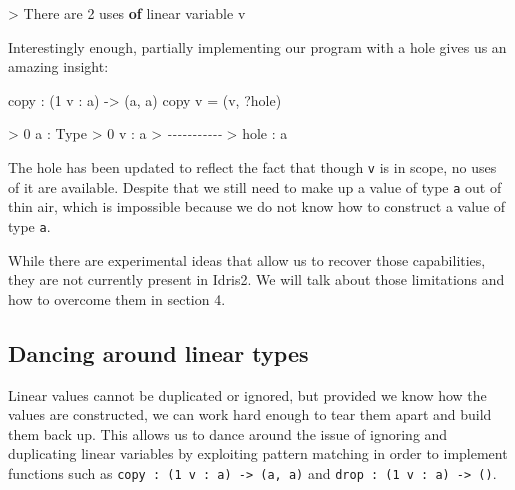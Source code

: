 \documentclass[
]{article}
\newenvironment{Shaded}{}{}
\newcommand{\CommentTok}[1]{\textcolor[rgb]{0.38,0.63,0.69}{\textit{#1}}}
\newcommand{\DataTypeTok}[1]{\textcolor[rgb]{0.56,0.13,0.00}{#1}}
\newcommand{\DecValTok}[1]{\textcolor[rgb]{0.25,0.63,0.44}{#1}}
\newcommand{\KeywordTok}[1]{\textcolor[rgb]{0.00,0.44,0.13}{\textbf{#1}}}
\newcommand{\NormalTok}[1]{#1}
\newcommand{\OperatorTok}[1]{\textcolor[rgb]{0.40,0.40,0.40}{#1}}
\newcommand{\OtherTok}[1]{\textcolor[rgb]{0.00,0.44,0.13}{#1}}
\begin{document}
\begin{Shaded}
\begin{Highlighting}[]
\OperatorTok{\textgreater{}} \DataTypeTok{There}\NormalTok{ are }\DecValTok{2}\NormalTok{ uses }\KeywordTok{of}\NormalTok{ linear variable v}
\end{Highlighting}
\end{Shaded}

Interestingly enough, partially implementing our program with a hole
gives us an amazing insight:

\begin{Shaded}
\begin{Highlighting}[]
\NormalTok{copy }\OperatorTok{:}\NormalTok{ (}\DecValTok{1}\NormalTok{ v }\OperatorTok{:}\NormalTok{ a) }\OtherTok{{-}\textgreater{}}\NormalTok{ (a, a)}
\NormalTok{copy v }\OtherTok{=}\NormalTok{ (v, }\OperatorTok{?}\NormalTok{hole)}
\end{Highlighting}
\end{Shaded}

\begin{Shaded}
\begin{Highlighting}[]
\OperatorTok{\textgreater{}} \DecValTok{0}\NormalTok{ a }\OperatorTok{:} \DataTypeTok{Type}
\OperatorTok{\textgreater{}} \DecValTok{0}\NormalTok{ v }\OperatorTok{:}\NormalTok{ a}
\OperatorTok{\textgreater{}} \CommentTok{{-}{-}{-}{-}{-}{-}{-}{-}{-}{-}{-}}
\OperatorTok{\textgreater{}}\NormalTok{ hole }\OperatorTok{:}\NormalTok{ a}
\end{Highlighting}
\end{Shaded}

The hole has been updated to reflect the fact that though \texttt{v} is
in scope, no uses of it are available. Despite that we still need to
make up a value of type \texttt{a} out of thin air, which is impossible
because we do not know how to construct a value of type \texttt{a}.

While there are experimental ideas that allow us to recover those
capabilities, they are not currently present in Idris2. We will talk
about those limitations and how to overcome them in section 4.

\hypertarget{dancing-around-linear-types}{%
\subsection{Dancing around linear
types}\label{dancing-around-linear-types}}

Linear values cannot be duplicated or ignored, but provided we know how
the values are constructed, we can work hard enough to tear them apart
and build them back up. This allows us to dance around the issue of
ignoring and duplicating linear variables by exploiting pattern matching
in order to implement functions such as
\texttt{copy\ :\ (1\ v\ :\ a)\ \textasciigrave{}-\textgreater{}\ (a,\ a)}
and \texttt{drop\ :\ (1\ v\ :\ a)\ -\textgreater{}\ ()}.
\end{document}
